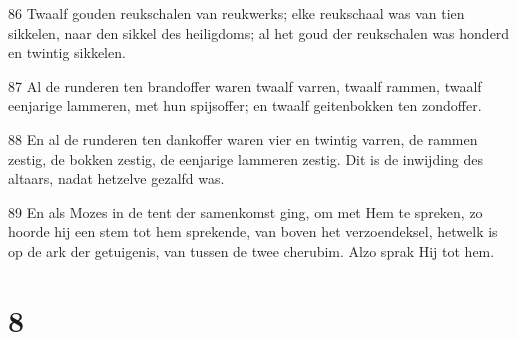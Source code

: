 \par 86 Twaalf gouden reukschalen van reukwerks; elke reukschaal was van tien sikkelen, naar den sikkel des heiligdoms; al het goud der reukschalen was honderd en twintig sikkelen.
\par 87 Al de runderen ten brandoffer waren twaalf varren, twaalf rammen, twaalf eenjarige lammeren, met hun spijsoffer; en twaalf geitenbokken ten zondoffer.
\par 88 En al de runderen ten dankoffer waren vier en twintig varren, de rammen zestig, de bokken zestig, de eenjarige lammeren zestig. Dit is de inwijding des altaars, nadat hetzelve gezalfd was.
\par 89 En als Mozes in de tent der samenkomst ging, om met Hem te spreken, zo hoorde hij een stem tot hem sprekende, van boven het verzoendeksel, hetwelk is op de ark der getuigenis, van tussen de twee cherubim. Alzo sprak Hij tot hem.

\chapter{8}

